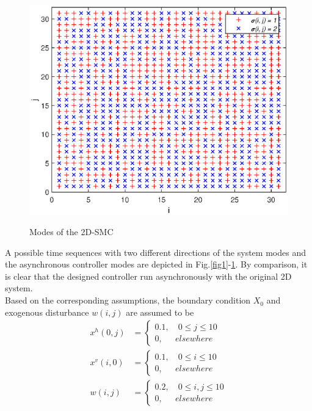 \documentclass[journal,final,twocolumn]{IEEEtran}
\begin{document}
\begin{figure}[!htb]
	\centering\includegraphics[scale=0.6]{./simulations/sigma_eps.eps}\\ 
	\caption{Modes of the 2D-SMC}
	\label{fig2}
\end{figure}
A possible time sequences with two different directions of the system modes and the asynchronous controller modes are depicted in Fig.\ref{fig1}-\ref{fig2}. By comparison, it is clear that the designed controller run asynchronously with the original 2D system.  \\
Based on the corresponding assumptions, the boundary condition $X_{0}$ and  exogenous disturbance $w(i,j)$ are assumed to be
\begin{equation*}
\begin{aligned}
	x^{h}(0, j)&=\begin{cases}
		0.1, \quad 0\leq j \leq 10 \\
		0, \quad \ \ elsewhere
	\end{cases} \\
	x^{v}(i, 0)&=\begin{cases}
	0.1, \quad 0\leq i \leq 10 \\
	0, \quad \ \ elsewhere
	\end{cases}\\
	w(i, j)\ &=\begin{cases}
	0.2, \quad 0\leq i,j \leq 10 \\
	0, \quad \ \ elsewhere
	\end{cases}
\end{aligned}
\end{equation*}
\end{document}
